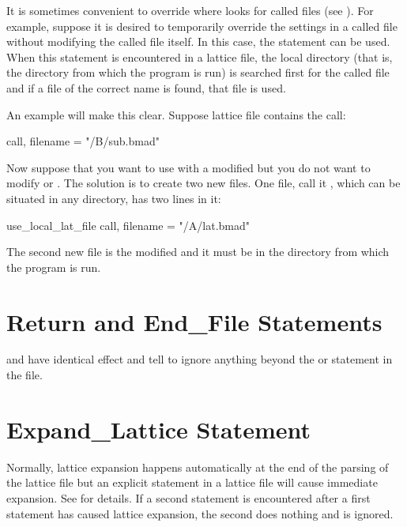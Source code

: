 {{{It is sometimes convenient to override where \bmad looks for called
files (see ). For example, suppose it is desired to
temporarily override the settings in a called file without modifying
the called file itself. In this case, the 
statement can be used. When this statement is encountered in a lattice
file, the local directory (that is, the directory from which the
program is run) is searched first for the called file and if a file
of the correct name is found, that file is used.

An example will make this clear. Suppose lattice file 
contains the call:
\begin{example}
  call, filename = "/B/sub.bmad"
\end{example}
Now suppose that you want to use  with a modified
 but you do not want to modify  or
. The solution is to create two new files. One file,
call it , which can be situated in any directory, has two
lines in it:
\begin{example}
  use_local_lat_file
  call, filename = "/A/lat.bmad"
\end{example}
The second new file is the modified  and it must be in the
directory from which the program is run.

\section{Return and End_File Statements}

 and  have identical effect and tell \bmad to
ignore anything beyond the  or  statement in
the file.

\section{Expand_Lattice Statement}
\label{s:expand.lat}

Normally, lattice expansion happens automatically at the end of the parsing of the lattice file but
an explicit  statement in a lattice file will cause immediate expansion. See
 for details. If a second  statement is encountered after a first
 statement has caused lattice expansion, the second  does
nothing and is ignored.

}}}
